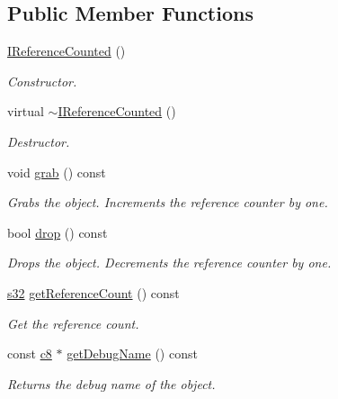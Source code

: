 \subsection*{Public Member Functions}
\begin{DoxyCompactItemize}
\item 
\mbox{\label{classirr_1_1IReferenceCounted_a8411682018e68a2752d4c82675c71040}} 
\hyperlink{classirr_1_1IReferenceCounted_a8411682018e68a2752d4c82675c71040}{I\+Reference\+Counted} ()
\begin{DoxyCompactList}\small\item\em Constructor. \end{DoxyCompactList}\item 
\mbox{\label{classirr_1_1IReferenceCounted_a78abc75801cbb13d9db0955b3c07251c}} 
virtual \hyperlink{classirr_1_1IReferenceCounted_a78abc75801cbb13d9db0955b3c07251c}{$\sim$\+I\+Reference\+Counted} ()
\begin{DoxyCompactList}\small\item\em Destructor. \end{DoxyCompactList}\item 
void \hyperlink{classirr_1_1IReferenceCounted_a396f9cdbe311ada278626477b3c6f0f5}{grab} () const
\begin{DoxyCompactList}\small\item\em Grabs the object. Increments the reference counter by one. \end{DoxyCompactList}\item 
bool \hyperlink{classirr_1_1IReferenceCounted_a03856a09355b89d178090c4a5f738543}{drop} () const
\begin{DoxyCompactList}\small\item\em Drops the object. Decrements the reference counter by one. \end{DoxyCompactList}\item 
\hyperlink{namespaceirr_ac66849b7a6ed16e30ebede579f9b47c6}{s32} \hyperlink{classirr_1_1IReferenceCounted_ae9836f102c33c68068e74292e0a01819}{get\+Reference\+Count} () const
\begin{DoxyCompactList}\small\item\em Get the reference count. \end{DoxyCompactList}\item 
const \hyperlink{namespaceirr_a9395eaea339bcb546b319e9c96bf7410}{c8} $\ast$ \hyperlink{classirr_1_1IReferenceCounted_ad336c6e3c975e4c7911a606c27b894f0}{get\+Debug\+Name} () const
\begin{DoxyCompactList}\small\item\em Returns the debug name of the object. \end{DoxyCompactList}\end{DoxyCompactItemize}

